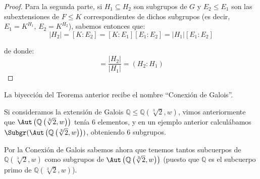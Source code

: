 \begin{teo}
\begin{proof}
        \noindent
        Para la segunda parte, si $H_1\subseteq H_2$ son subgrupos de $G$ y $E_2\leq E_1$ son las subextensiones de $F\leq K$ correspondientes de dichos subgrupos (es decir, $E_1 = K^{H_1}$, $E_2 = K^{H_2}$), sabemos entonces que:
        \begin{equation*}
            |H_2| = [K:E_2] = [K:E_1] [E_1:E_2] = |H_1|[E_1:E_2]
        \end{equation*}

        de donde:
        \begin{equation*}
            [E_1:E_2] = \dfrac{|H_2|}{|H_1|} = (H_2:H_1)
        \end{equation*}
    \end{proof}
\end{teo}


\begin{definicion}
    La biyección del Teorema anterior recibe el nombre ``Conexión de Galois''.
\end{definicion}

\begin{ejemplo}
    Si consideramos la extensión de Galois $\mathbb{Q}\leq \mathbb{Q}\left(\sqrt[3]{2},w\right)$, vimos anteriormente que $\Aut\left(\mathbb{Q}\left(\sqrt[3]{2},w\right)\right)$ tenía 6 elementos, y en un ejemplo anterior calculábamos $\Subgr(\Aut\left(\mathbb{Q}\left(\sqrt[3]{2},w\right)\right))$, obteniendo 6 subgrupos. 

    Por la Conexión de Galois sabemos ahora que tenemos tantos subcuerpos de $\mathbb{Q}\left(\sqrt[3]{2},w\right)$ como subgrupos de $\Aut\left(\mathbb{Q}\left(\sqrt[3]{2},w\right)\right)$ (puesto que $\mathbb{Q}$ es el subcuerpo primo de $\mathbb{Q}\left(\sqrt[3]{2},w\right)$).
\end{ejemplo}

